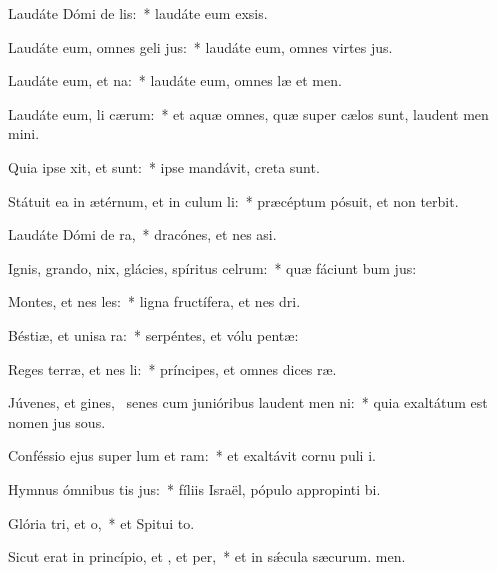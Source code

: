 \item Laudáte Dómi de lis:~* laudáte eum  exsis.
\item Laudáte eum, omnes geli jus:~* laudáte eum, omnes virtes jus.
\item Laudáte eum,  et na:~* laudáte eum, omnes læ et men.
\item Laudáte eum, li cærum:~* et aquæ omnes, quæ super cælos sunt, laudent men mini.
\item Quia ipse xit, et  sunt:~* ipse mandávit,  creta sunt.
\item Státuit ea in ætérnum, et in culum li:~* præcéptum pósuit, et non terbit.
\item Laudáte Dómi de ra,~* dracónes, et nes asi.
\item Ignis, grando, nix, glácies, spíritus celrum:~* quæ fáciunt bum jus:
\item Montes, et nes les:~* ligna fructífera, et nes dri.
\item Béstiæ, et unisa ra:~* serpéntes, et vólu pentæ:
\item Reges terræ, et nes li:~* príncipes, et omnes dices ræ.
\item Júvenes, et gines,~\pscross{} senes cum junióribus laudent men ni:~* quia exaltátum est nomen jus sous.
\item Conféssio ejus super lum et ram:~* et exaltávit cornu puli i.
\item Hymnus ómnibus tis jus:~* fíliis Israël, pópulo appropinti bi.
\item Glória tri, et o,~* et Spitui to.
\item Sicut erat in princípio, et , et per,~* et in sǽcula sæcurum. men.
